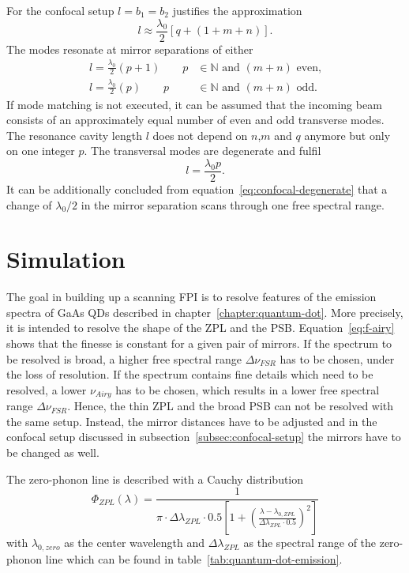 For the confocal setup $l=b_1=b_2$ justifies the approximation
\begin{equation}
l \approx \frac{\lambda_0}{2} \left[q + \left(1+m+n\right)\right].
\end{equation}
The modes resonate at mirror separations of either
\begin{align}
l = \frac{\lambda_0}{2}(p+1) \qquad p&\in\mathbb{N} \textrm{ and } (m+n) \textrm{ even,} \\
l = \frac{\lambda_0}{2}(p) \qquad p&\in\mathbb{N} \textrm{ and } (m+n) \textrm{ odd.}
\end{align}
If mode matching is not executed, it can be assumed that the incoming beam consists of an approximately equal number of even and odd transverse modes.
The resonance cavity length $l$ does not depend on $n$,$m$ and $q$ anymore but only on one integer $p$. The transversal modes are degenerate and fulfil
\begin{equation}
\label{eq:confocal-degenerate}
l = \frac{\lambda_0 p}{2}.
\end{equation}
It can be additionally concluded from equation~\eqref{eq:confocal-degenerate} that a change of $\lambda_0/2$ in the mirror separation scans through one free spectral range.
\section{Simulation}

The goal in building up a scanning \ac{FPI} is to resolve features of the emission spectra of GaAs \aclp{QD} described in chapter~\ref{chapter:quantum-dot}.
More precisely, it is intended to resolve the shape of the \ac{ZPL} and the \ac{PSB}.
Equation~\ref{eq:f-airy} shows that the finesse is constant for a given pair of mirrors.
If the spectrum to be resolved is broad, a higher free spectral range $\Delta \nu_{FSR}$ has to be chosen, under the loss of resolution.
If the spectrum contains fine details which need to be resolved, a lower $\nu_{Airy}$ has to be chosen, which results in a lower free spectral range $\Delta \nu_{FSR}$.
Hence, the thin \ac{ZPL} and the broad \ac{PSB} can not be resolved with the same setup.
Instead, the mirror distances have to be adjusted and in the confocal setup discussed in subsection~\ref{subsec:confocal-setup} the mirrors have to be changed as well.

The zero-phonon line is described with a Cauchy distribution
\begin{equation}
\Phi_{ZPL}(\lambda) = \frac{1}{\pi \cdot \Delta\lambda_{ZPL} \cdot 0.5 \left[1+\left(\frac{\lambda - \lambda_{0, ZPL}}{\Delta\lambda_{ZPL} \cdot 0.5}\right)^2\right]}
\end{equation}
with $\lambda_{0, zero}$ as the center wavelength and $\Delta\lambda_{ZPL}$ as the spectral range of the zero-phonon line which can be found in table~\ref{tab:quantum-dot-emission}.

